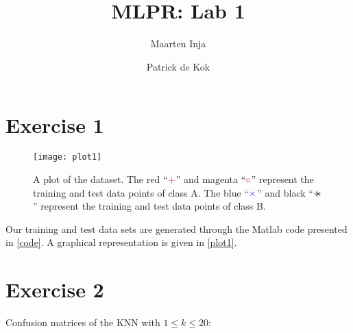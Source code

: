 \documentclass[a4paper,11pt]{article}
\author{Maarten Inja \and Patrick de Kok}
\title{MLPR: Lab 1}
\newcommand{\convolution}{\ensuremath{+\negmedspace\negmedspace\negmedspace\times}}
\begin{document}
\maketitle

\section*{Exercise 1}
\begin{figure}[h]
  \caption{A plot of the dataset.  The red ``$\color{red}+$'' and magenta ``$\color{magenta}\circ$'' represent the training and test data points of class A.  The blue ``$\color{blue}\times$'' and black ``$\convolution$'' represent the training and test data points of class B.}
  \label{plot1}
  \begin{center}
    \texttt{[image: plot1]}
  \end{center}
\end{figure}

Our training and test data sets are generated through the Matlab code presented in \autoref{code}.  A graphical representation is given in \autoref{plot1}.



\section*{Exercise 2}
Confusion matrices of the KNN with $1 \leq k \leq 20$:
\end{document}
